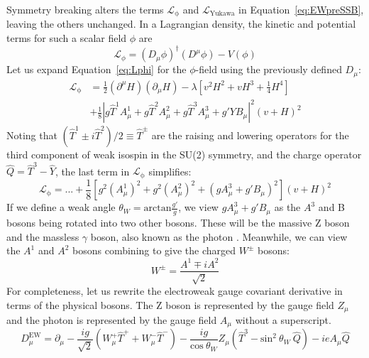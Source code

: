 Symmetry breaking alters the terms $\mathcal{L}_\mathrm{\phi}$ and $\mathcal{L}_\mathrm{Yukawa}$ in Equation~\ref{eq:EWpreSSB}, leaving the others unchanged. In a Lagrangian density, the kinetic and potential terms for such a scalar field $\phi$ are
\begin{equation}
\mathcal{L}_\phi = (D_\mu\phi)^\dagger(D^\mu\phi) - V(\phi) \label{eq:Lphi}
\end{equation}
Let us expand Equation~\ref{eq:Lphi} for the $\phi$-field using the previously defined $D_\mu$:
\begin{equation}
\begin{split}
\mathcal{L}_\mathrm{\phi} & = \frac{1}{2} (\partial^\mu H) (\partial_\mu H) - \lambda\left[ v^2H^2 + vH^3 + \frac{1}{4}H^4\right] \\
& + \frac{1}{8} \left| g \hat{T}^1 A^1_\mu + g \hat{T}^2 A^2_\mu + g \hat{T}^3 A^3_\mu + g' Y B_\mu \right|^2 (v+H)^2
\end{split}
\end{equation}
Noting that $(\hat{T}^1 \pm i \hat{T}^2)/2 \equiv \hat{T}^\pm$ are the raising and lowering operators 
for the third component of weak isospin in the SU(2) symmetry,
and the charge operator $\hat{Q} = \hat{T}^3 - \hat{Y}$,
the last term in $\mathcal{L}_\mathrm{\phi}$ simplifies:
\begin{equation}
\mathcal{L}_\mathrm{\phi} = ... + \frac{1}{8}\left[ g^2(A^1_\mu)^2 + g^2(A^2_\mu)^2  + \left( gA^3_\mu + g' B_\mu \right)^2 \right] (v+H)^2
\end{equation}
If we define a weak angle $\theta_W = \mathrm{arctan}\frac{g'}{g}$, 
we view $gA^3_\mu + g' B_\mu$ as the $A^3$ and B bosons being rotated into two other bosons. 
These will be the massive Z boson and the massless $\gamma$ boson, also known as the photon \cite{Weinberg1967}.
Meanwhile, we can view the $A^1$ and $A^2$ bosons combining to give the charged $W^\pm$ bosons:
\begin{equation}
W^\pm = \frac{A^1 \mp iA^2}{\sqrt{2}} \label{eq:WpmA12}
\end{equation}
For completeness, let us rewrite the electroweak gauge covariant derivative in terms of the physical bosons.
The Z boson is represented by the gauge field $Z_\mu$ and the photon is represented by the gauge field $A_\mu$ without a superscript.
\begin{equation}
\label{eq:covariant_derivative}
D_\mu^\mathrm{EW} = \partial_\mu - \frac{ig}{\sqrt{2}} (W_\mu^+ \hat{T}^+ + W_\mu^- \hat{T}^-) - \frac{ig}{\mathrm{cos}\:\theta_W} Z_\mu( \hat{T}^3 - \mathrm{sin}^2 \: \theta_W \: \hat{Q}) - ie A_\mu \hat{Q}
\end{equation}
